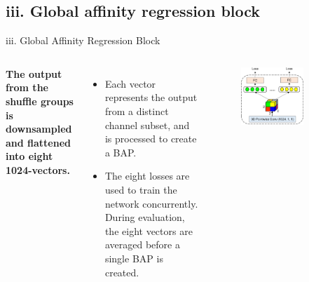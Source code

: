 \documentclass[aspectratio=169,xcolor=dvipsnames]{beamer}
\begin{document}
\subsection{iii. Global affinity regression block}
\begin{frame}{iii. Global Affinity Regression Block}
    \begin{columns}[c]
        \textbf{The output from the shuffle groups is downsampled and flattened into eight 
        1024-vectors.}
        \begin{itemize}
            \item Each vector represents the output from a distinct channel subset, and is 
            processed to create a BAP.
            \item The eight losses are used to train the network concurrently. During 
            evaluation, the eight vectors are averaged before a single BAP is created.
        \end{itemize}
        \begin{figure}
            \includegraphics[width=0.7\textwidth]{images/gar_block}
        \end{figure}
    \end{columns}
\end{frame}


\end{document}
